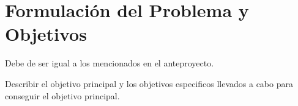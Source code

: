 \chapter{Formulación del Problema y Objetivos}
\label{ch:objetivos}

Debe de ser igual a los mencionados en el anteproyecto.

Describir el objetivo principal y los objetivos especificos llevados a cabo para conseguir el objetivo principal.


